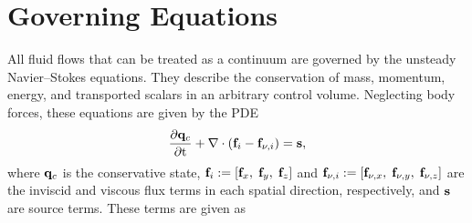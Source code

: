 \section{Governing Equations}\label{sec:govEqs}

All fluid flows that can be treated as a continuum are governed by the unsteady Navier--Stokes equations. They describe the conservation of mass, momentum, energy, and transported scalars in an arbitrary control volume. Neglecting body forces, these equations are given by the PDE
%
\begin{equation}\label{eq:gemsGovPDE}
    \frac{\partial \mathbf{q}_{c}}{\partial \text{t}} + \nabla \cdot (\mathbf{f}_{i} - \mathbf{f}_{\nu,i}) = \mathbf{s},
\end{equation}
%
where $\mathbf{q}_{c}$ is the conservative state, $\mathbf{f}_{i} := [\mathbf{f}_x, \; \mathbf{f}_y, \; \mathbf{f}_z]$ and $\mathbf{f}_{\nu,i} := [\mathbf{f}_{\nu,x}, \; \mathbf{f}_{\nu,y}, \; \mathbf{f}_{\nu,z}]$ are the inviscid and viscous flux terms in each spatial direction, respectively, and $\mathbf{s}$ are source terms. These terms are given as
%

